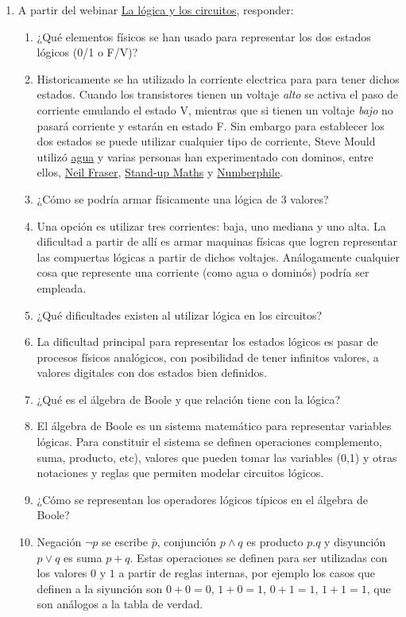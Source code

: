 \documentclass[a4paper]{article}
\newcommand{\Item}{\item[\stepcounter{enumii}$\blacktriangleright$\textbf{(\alph{enumii})}]} %
\newcommand{\answer}{\item[**]}
\newcommand{\exercise}{\item}
\begin{document}
\begin{enumerate}[resume]
\begin{enumerate} [label=(\alph*)]
	\end{enumerate}

	\iffalse
	\exercise A partir del webinar \href{https://youtu.be/kU3_XLfn4jo}{La lógica y los circuitos}, responder:
	\begin{enumerate} [label=(\alph*)]
		\Item ¿Qué elementos físicos se han usado para representar los dos estados lógicos (0/1 o F/V)? 
		\answer Historicamente se ha utilizado la corriente electrica para para tener dichos estados. Cuando los transistores tienen un voltaje \textit{alto} se activa el paso de corriente emulando el estado V, mientras que si tienen un voltaje \textit{bajo} no pasará corriente y estarán en estado F. Sin embargo para establecer los dos estados se puede utilizar cualquier tipo de corriente, Steve Mould utilizó \href{https://youtu.be/IxXaizglscw}{agua} y varias personas han experimentado con dominos, entre ellos, \href{https://youtu.be/SudixyugiX4}{Neil Fraser}, \href{https://youtu.be/OpLU__bhu2w}{Stand-up Maths} y \href{https://youtu.be/lNuPy-r1GuQ}{Numberphile}.  

		\item ¿Cómo se podría armar físicamente una lógica de 3 valores? 
		\answer Una opción es utilizar tres corrientes: baja, uno mediana y uno alta. La dificultad a partir de allí es armar maquinas físicas que logren representar las compuertas lógicas a partir de dichos voltajes. Análogamente cualquier cosa que represente una corriente (como agua o dominós) podría ser empleada. 

		\item ¿Qué dificultades existen al utilizar lógica en los circuitos? 
		\answer La dificultad principal para representar los estados lógicos es pasar de procesos físicos analógicos, con posibilidad de tener infinitos valores, a valores digitales con dos estados bien definidos. 

		\Item ¿Qué es el álgebra de Boole y que relación tiene con la lógica?
		\answer El álgebra de Boole es un sistema matemático para representar variables lógicas. Para constituir el sistema se definen operaciones complemento, suma, producto, etc), valores que pueden tomar las variables (0,1) y otras notaciones y reglas que permiten modelar circuitos lógicos.
		
		\Item ¿Cómo se representan los operadores lógicos típicos en el álgebra de Boole? 
		\answer Negación $\neg p$ se escribe $\bar{p}$, conjunción $p\land q$ es producto $p.q$ y disyunción $p \lor q$ es suma $p+q$. Estas operaciones se definen para ser utilizadas con los valores $0$ y $1$ a partir de reglas internas, por ejemplo los casos que definen a la siyunción son $0+0=0$, $1+0=1$, $0+1=1$, $1+1=1$, que son análogos a la tabla de verdad.


\end{enumerate}
\end{enumerate}
\end{document}
